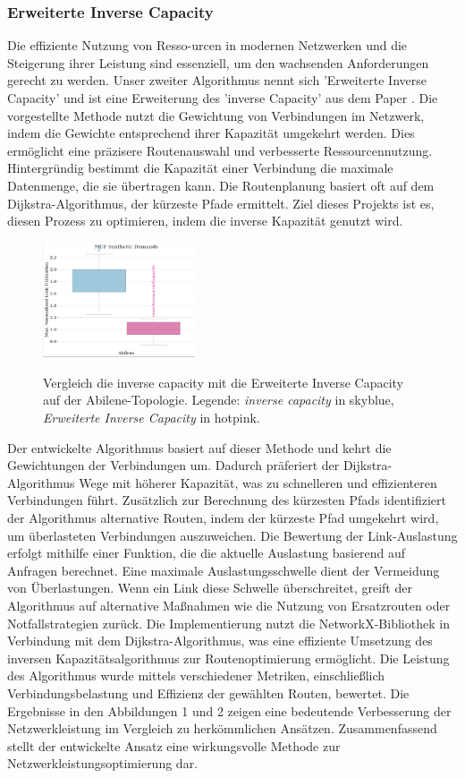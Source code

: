 \documentclass[sigconf, nonacm, review]{acmart}
\begin{document}
\subsubsection{Erweiterte Inverse Capacity} 
Die effiziente Nutzung von 
Resso-urcen in modernen Netzwerken und die Steigerung ihrer Leistung sind essenziell, um den wachsenden Anforderungen gerecht zu werden. Unser zweiter Algorithmus nennt sich 'Erweiterte Inverse Capacity' und ist eine Erweiterung des 'inverse Capacity' aus dem Paper \cite{foerster2021}. Die vorgestellte Methode nutzt die Gewichtung von Verbindungen im Netzwerk, indem die Gewichte entsprechend ihrer Kapazität umgekehrt werden. Dies ermöglicht eine präzisere Routenauswahl und verbesserte Ressourcennutzung. Hintergründig bestimmt die Kapazität einer Verbindung die maximale Datenmenge, die sie übertragen kann. Die Routenplanung basiert oft auf dem Dijkstra-Algorithmus, der kürzeste Pfade ermittelt. Ziel dieses Projekts ist es, diesen Prozess zu optimieren, indem die inverse Kapazität genutzt wird.
\begin{figure}[h]
\centering
{\hspace{+6cm}\includegraphics[width=0.4\textwidth]{a4.png}} 
\caption{Vergleich die inverse capacity mit die Erweiterte Inverse Capacity auf der Abilene-Topologie. Legende: \emph{inverse capacity} in skyblue, \emph{Erweiterte Inverse Capacity} in hotpink.}
\label{fig:1}
\end{figure}
Der entwickelte Algorithmus basiert auf dieser Methode und kehrt die Gewichtungen der Verbindungen um. Dadurch präferiert der Dijkstra-Algorithmus Wege mit höherer Kapazität, was zu schnelleren und effizienteren Verbindungen führt. Zusätzlich zur Berechnung des kürzesten Pfads identifiziert der Algorithmus alternative Routen, indem der kürzeste Pfad umgekehrt wird, um überlasteten Verbindungen auszuweichen. Die Bewertung der Link-Auslastung erfolgt mithilfe einer Funktion, die die aktuelle Auslastung basierend auf Anfragen berechnet. Eine maximale Auslastungsschwelle dient der Vermeidung von Überlastungen. Wenn ein Link diese Schwelle überschreitet, greift der Algorithmus auf alternative Maßnahmen wie die Nutzung von Ersatzrouten oder Notfallstrategien zurück. Die Implementierung nutzt die NetworkX-Bibliothek in Verbindung mit dem Dijkstra-Algorithmus, was eine effiziente Umsetzung des inversen Kapazitätsalgorithmus zur Routenoptimierung ermöglicht. Die Leistung des Algorithmus wurde mittels verschiedener Metriken, einschließlich Verbindungsbelastung und Effizienz der gewählten Routen, bewertet. Die Ergebnisse in den Abbildungen 1 und 2 zeigen eine bedeutende Verbesserung der Netzwerkleistung im Vergleich zu herkömmlichen Ansätzen. Zusammenfassend stellt der entwickelte Ansatz eine wirkungsvolle Methode zur Netzwerkleistungsoptimierung dar.
\end{document}
